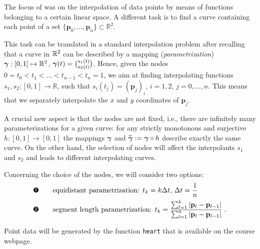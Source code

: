 

\begin{problem} \label{prb:CurveInterp}

The focus of  was on the interpolation of
data points by means of functions belonging to a certain linear space. %
A different task is to find a curve containing each point of a set
$\{\mathbf{p}_0,...,\mathbf{p}_n\}\subset \mathbb{R}^2$.

This task can be translated in a standard interpolation problem after recalling
that a curve in $\mathbb{R}^{2}$ can be described by a mapping (\emph{parametrization})
$\boldsymbol{\gamma}:[0,1]\mapsto\mathbb{R}^{2}$, $\boldsymbol{\gamma}(t) = \binom{s_{1}(t)}{s_{2}(t)}$. Hence,
given the nodes $0 = t_0 < t_{1} < ... < t_{n-1} < t_n = 1$, we aim at finding interpolating
functions $s_1, s_2: [0,1] \rightarrow \mathbb{R}$, such that $s_i(t_j)
= (\mathbf{p}_j)_i$, $i=1,2$, $j=0,...,n$. This means that we separately
interpolate the $x$ and $y$ coordinates of $\mathbf{p}_j$.

A crucial new aspect is that the nodes are not fixed, i.e., there are infinitely many parameterizations for a given curve: for any strictly
monotonous and surjective $h:[0,1]\rightarrow[0,1]$ %
the mappings $\boldsymbol{\gamma}$ and $\widetilde{\boldsymbol{\gamma}} :=
\boldsymbol{\gamma}\circ h$ describe exactly the same curve. On the other hand, the selection of
nodes will affect the interpolants $s_{1}$ and $s_{2}$ and leads to different
interpolating curves.


Concerning the choice of the nodes, we will consider two options:
\begin{align}
  \label{eq:pte}
  \text{\ding{202}}\qquad & \text{equidistant parametrization: $t_k = k \Delta t$,
    $\Delta t = \frac{1}{n}$}\\
  \label{eq:ptl}
  \text{\ding{203}}\qquad & \text{segment length parametrization:
$\displaystyle{t_k = \frac{\sum_{l=1}^k|\mathbf{p}_l - \mathbf{p}_{l-1}|}{\sum_{l=1}^n|\mathbf{p}_l - \mathbf{p}_{l-1}|}}$}\;.
\end{align}


Point data will be generated by the \Matlab{} function \;\texttt{heart}\;  that is available on the course webpage.


\end{problem}
